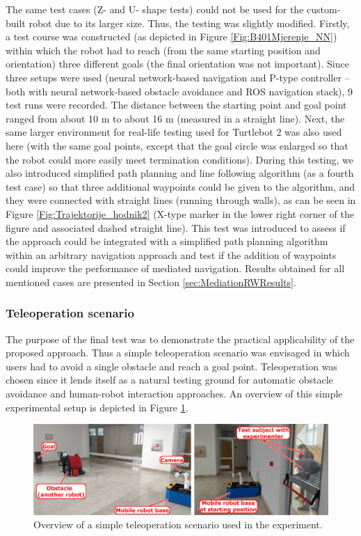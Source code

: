 The same test cases (Z- and U- shape tests) could not be used for the custom-built robot due to its larger size. Thus, the testing was slightly modified. Firstly, a test course was constructed (as depicted in Figure \ref{Fig:B401Mjerenje_NN}) within which the robot had to reach (from the same starting position and orientation) three different goals (the final orientation was not important). Since three setups were used (neural network-based navigation and P-type controller -- both with neural network-based obstacle avoidance and ROS navigation stack), 9 test runs were recorded. The distance between the starting point and goal point ranged from about 10 m to about 16 m (measured in a straight line). Next, the same larger environment for real-life testing used for Turtlebot 2 was also used here (with the same goal points, except that the goal circle was enlarged so that the robot could more easily meet termination conditions). During this testing, we also introduced simplified path planning and line following algorithm (as a fourth test case) so that three additional waypoints could be given to the algorithm, and they were connected with straight lines (running through walls), as can be seen in Figure \ref{Fig:Trajektorije_hodnik2} (X-type marker in the lower right corner of the figure and associated dashed straight line). This test was introduced to assess if the approach could be integrated with a simplified path planning algorithm within an arbitrary navigation approach and test if the addition of waypoints could improve the performance of mediated navigation. Results obtained for all mentioned cases are presented in Section \ref{sec:MediationRWResults}.

\subsubsection{Teleoperation scenario} \label{sec:MediationApp}

The purpose of the final test was to demonstrate the practical applicability of the proposed approach. Thus a simple teleoperation scenario was envisaged in which users had to avoid a single obstacle and reach a goal point. Teleoperation was chosen since it lends itself as a natural testing ground for automatic obstacle avoidance and human-robot interaction approaches. An overview of this simple experimental setup is depicted in Figure \ref{Fig:tele2Course}.

\begin{figure}
\centering
\includegraphics[width=1\columnwidth]{slike/teleop.png}
\caption{Overview of a simple teleoperation scenario used in the experiment.}
\label{Fig:tele2Course}
\end{figure}


